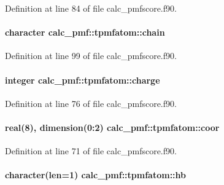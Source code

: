 Definition at line 84 of file calc\-\_\-pmfscore.\-f90.

\hypertarget{structcalc__pmf_1_1tpmfatom_a54cc738bc9fd3d938d83848a6959ffec}{
\paragraph[{chain}]{\setlength{\rightskip}{0pt plus 5cm}character calc\-\_\-pmf\-::tpmfatom\-::chain}}\label{structcalc__pmf_1_1tpmfatom_a54cc738bc9fd3d938d83848a6959ffec}


Definition at line 99 of file calc\-\_\-pmfscore.\-f90.

\hypertarget{structcalc__pmf_1_1tpmfatom_a2be2ed387eda26b764c9d48c95702cd4}{
\paragraph[{charge}]{\setlength{\rightskip}{0pt plus 5cm}integer calc\-\_\-pmf\-::tpmfatom\-::charge}}\label{structcalc__pmf_1_1tpmfatom_a2be2ed387eda26b764c9d48c95702cd4}


Definition at line 76 of file calc\-\_\-pmfscore.\-f90.

\hypertarget{structcalc__pmf_1_1tpmfatom_a29f4e9abcc93bc7da749c6a1e322b6c7}{
\paragraph[{coor}]{\setlength{\rightskip}{0pt plus 5cm}real(8), dimension(0\-:2) calc\-\_\-pmf\-::tpmfatom\-::coor}}\label{structcalc__pmf_1_1tpmfatom_a29f4e9abcc93bc7da749c6a1e322b6c7}


Definition at line 71 of file calc\-\_\-pmfscore.\-f90.

\hypertarget{structcalc__pmf_1_1tpmfatom_a365f3fac20021dcfe68b5ced49e646cf}{
\paragraph[{hb}]{\setlength{\rightskip}{0pt plus 5cm}character(len=1) calc\-\_\-pmf\-::tpmfatom\-::hb}}\label{structcalc__pmf_1_1tpmfatom_a365f3fac20021dcfe68b5ced49e646cf}


